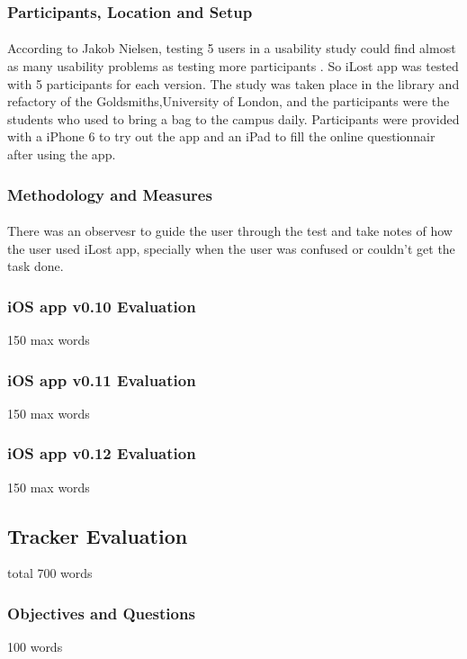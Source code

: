 \documentclass[12pt,a4paper]{article}
\begin{document}
        \subsubsection{Participants, Location and Setup}
          \paragraph{}
          According to Jakob Nielsen, testing 5 users in a usability study could find almost as many usability problems as testing more participants\cite{LostAndFound} . So iLost app was tested with 5 participants for each version. The study was taken place in the library and refactory of the Goldsmiths,University of London, and the participants were the students who used to bring a bag to the campus daily. Participants were provided with a iPhone 6 to try out the app and an iPad to fill the online questionnair after using the app. 
          
        \subsubsection{Methodology and Measures}
          \paragraph{}
            There was an observesr to guide the user through the test and take notes of how the user used iLost app, specially when the user was confused or couldn't get the task done.
        \subsubsection{iOS app v0.10 Evaluation}
          150 max words
        \subsubsection{iOS app v0.11 Evaluation}
          150 max words
        \subsubsection{iOS app v0.12 Evaluation}
          150 max words
      \subsection{Tracker Evaluation}
          total 700 words
        \subsubsection{Objectives and Questions}
          100 words
\end{document}
